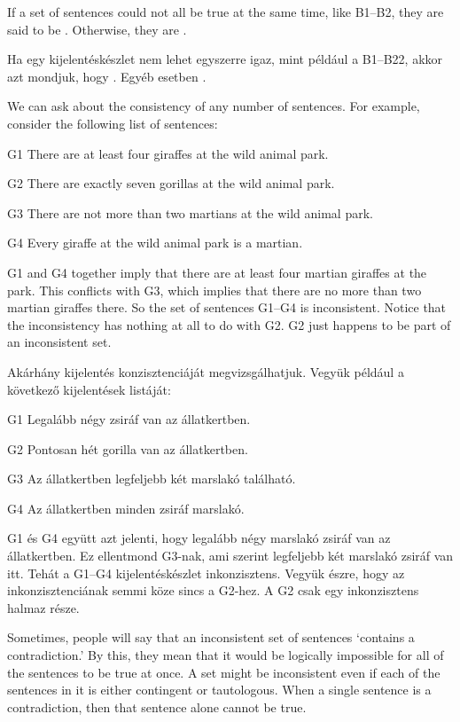If a set of sentences could not all be true at the same time, like B1--B2, they are said to be . Otherwise, they are .

Ha egy kijelentéskészlet nem lehet egyszerre igaz, mint például a B1--B22, akkor azt mondjuk, hogy . Egyéb esetben .

We can ask about the consistency of any number of sentences. For example, consider the following list of sentences:
\label{MartianGiraffes}
\begin{ekey}
\item[G1] There are at least four giraffes at the wild animal park.
\item[G2] There are exactly seven gorillas at the wild animal park.
\item[G3] There are not more than two martians at the wild animal park.
\item[G4] Every giraffe at the wild animal park is a martian.
\end{ekey}
G1 and G4 together imply that there are at least four martian giraffes at the park. This conflicts with G3, which implies that there are no more than two martian giraffes there. So the set of sentences G1--G4 is inconsistent. Notice that the inconsistency has nothing at all to do with G2. G2 just happens to be part of an inconsistent set.

Akárhány kijelentés konzisztenciáját megvizsgálhatjuk. Vegyük például a következő kijelentések listáját:
\label{MartianGiraffes}
\begin{ekey}
\item[G1] Legalább négy zsiráf van az állatkertben.
\item[G2] Pontosan hét gorilla van az állatkertben.
\item[G3] Az állatkertben legfeljebb két marslakó található.
\item[G4] Az állatkertben minden zsiráf marslakó.
\end{ekey}
G1 és G4 együtt azt jelenti, hogy legalább négy marslakó zsiráf van az állatkertben. Ez ellentmond G3-nak, ami szerint legfeljebb két marslakó zsiráf van itt. Tehát a G1--G4 kijelentéskészlet inkonzisztens. Vegyük észre, hogy az inkonzisztenciának semmi köze sincs a G2-hez. A G2 csak egy inkonzisztens halmaz része.

Sometimes, people will say that an inconsistent set of sentences ‘contains a contradiction.’ By this, they mean that it would be logically impossible for all of the sentences to be true at once. A set might be inconsistent even if each of the sentences in it is either contingent or tautologous. When a single sentence is a contradiction, then that sentence alone cannot be true.

